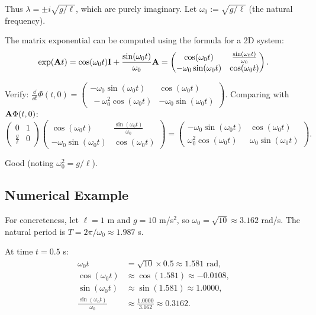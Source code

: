Thus $\lambda = \pm i\sqrt{g/\ell}$, which are purely imaginary. Let $\omega_0 := \sqrt{g/\ell}$ (the natural frequency).

The matrix exponential can be computed using the formula for a 2D system:
\begin{equation}
\exp(\mathbf{A}t) = \cos(\omega_0 t)\mathbf{I} + \frac{\sin(\omega_0 t)}{\omega_0}\mathbf{A}
= \begin{pmatrix}\cos(\omega_0 t) & \frac{\sin(\omega_0 t)}{\omega_0}\\
-\omega_0\sin(\omega_0 t) & \cos(\omega_0 t)\end{pmatrix}.
\label{eq:ch2:pend-stm}
\end{equation}

Verify: $\frac{\dd}{\dd t}\Phi(t,0) = \begin{pmatrix}-\omega_0\sin(\omega_0 t) & \cos(\omega_0 t)\\\
-\omega_0^2\cos(\omega_0 t) & -\omega_0\sin(\omega_0 t)\end{pmatrix}$. Comparing with $\mathbf{A}\Phi(t,0)$:
\begin{equation}
\begin{pmatrix}0 & 1\\\frac{g}{\ell} & 0\end{pmatrix}\begin{pmatrix}\cos(\omega_0 t) & \frac{\sin(\omega_0 t)}{\omega_0}\\
-\omega_0\sin(\omega_0 t) & \cos(\omega_0 t)\end{pmatrix}
= \begin{pmatrix}-\omega_0\sin(\omega_0 t) & \cos(\omega_0 t)\\
\omega_0^2\cos(\omega_0 t) & \omega_0\sin(\omega_0 t)\end{pmatrix}.
\end{equation}

Good (noting $\omega_0^2 = g/\ell$).

\subsection{Numerical Example}

For concreteness, let $\ell = 1$ m and $g = 10$ m/s$^2$, so $\omega_0 = \sqrt{10} \approx 3.162$ rad/s.
The natural period is $T = 2\pi/\omega_0 \approx 1.987$ s.

At time $t = 0.5$ s:
\begin{align}
\omega_0 t &= \sqrt{10} \times 0.5 \approx 1.581 \text{ rad},\\
\cos(\omega_0 t) &\approx \cos(1.581) \approx -0.0108,\\
\sin(\omega_0 t) &\approx \sin(1.581) \approx 1.0000,\\
\frac{\sin(\omega_0 t)}{\omega_0} &\approx \frac{1.0000}{3.162} \approx 0.3162.
\end{align}

